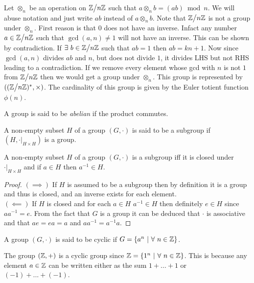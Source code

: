 \begin{example}
  Let $\otimes_n$ be an operation on $\Z\bign/n\Z$ such that $a\otimes_n b = (ab)\bmod n$. We will abuse notation and just write $ab$ instead of $a\otimes_n b$. Note that $\Z\bign/n\Z$ is not a group under $\otimes_n$. First reason is that $0$ does not have an inverse. Infact any number $a\in \Z\bign/n\Z$ such that $\gcd(a,n)\neq 1$ will not have an inverse. This can be shown by contradiction. If $\exists\ b\in \Z\bign/n\Z $ such that $ab = 1$ then $ab = kn + 1$. Now since $\gcd(a,n)$ divides $ab$ and $n$, but does not divide $1$, it divides LHS but not RHS leading to a contradiction. If we remove every element whose gcd with $n$ is not $1$ from $ \Z\bign/n\Z$ then we would get a group under $\otimes_n$. This group is represented by $((\Z\bign/n\Z)^*, \times)$. The cardinality of this group is given by the Euler totient function $\phi(n)$.
\end{example}
\begin{definition}
  A group is said to be \textit{abelian} if the product commutes.
\end{definition}
\begin{definition}
  A non-empty subset $H$ of a group $(G,\cdot)$ is said to be a subgroup if $(H,\cdot\big|_{H\times H})$ is a group. 
\end{definition}
\begin{proposition}\label{prop:subgrp}
  A non-empty subset $H$ of a group $(G,\cdot)$ is a subgroup iff it is closed under $\cdot\big|_{H\times H}$ and if $a\in H$ then $a^{-1}\in H$. 
\end{proposition}
\begin{proof}
  $(\implies)$ If $H$ is assumed to be a subgroup then by definition it is a group and thus is closed, and an inverse exists for each element.\\

  $(\impliedby)$ If $H$ is closed and for each $a\in H$ $a^{-1}\in H$ then definitely $e\in H$ since $aa^{-1} = e$. From the fact that $G$ is a group it can be deduced that $\cdot$ is associative and that $ae = ea = a$ and $aa^{-1} = a^{-1}a$.
\end{proof}
\begin{definition}
  A group $(G,\cdot)$ is said to be cyclic if $G=\{a^n\ |\ \forall\ n\in \Z\}$.
\end{definition}
\begin{example}
  The group $(\mathbb{Z}, +)$ is a cyclic group since $\mathbb{Z} = \{1^n\ |\ \forall\ n\in \mathbb{Z}\}$. This is because any element $a\in \mathbb{Z}$ can be written either as the sum $1+...+1$ or $(-1)+...+(-1)$.
\end{example}

